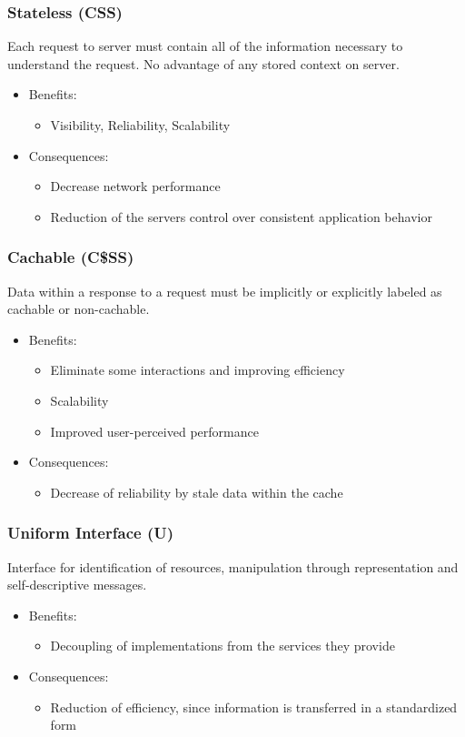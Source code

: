 \subsubsection*{Stateless (CSS)}
Each request to server must contain all of the information necessary to understand the request. No advantage of any stored context on server.
\begin{itemize}[noitemsep, topsep=0pt]
	\item Benefits:
		\begin{itemize}[noitemsep, topsep=0pt]
			\item Visibility, Reliability, Scalability
		\end{itemize}
	\item Consequences:	
		\begin{itemize}[noitemsep, topsep=0pt]
			\item Decrease network performance
			\item Reduction of the servers control over consistent application behavior
		\end{itemize} 
\end{itemize}
\subsubsection*{Cachable (C\$SS)}
Data within a response to a request must be implicitly or explicitly labeled as cachable or non-cachable.
\begin{itemize}[noitemsep, topsep=0pt]
	\item Benefits:
		\begin{itemize}[noitemsep, topsep=0pt]
			\item Eliminate some interactions and improving efficiency
			\item Scalability
			\item Improved user-perceived performance
		\end{itemize}
	\item Consequences:
		\begin{itemize}[noitemsep, topsep=0pt]
			\item Decrease of reliability by stale data within the cache
		\end{itemize}
\end{itemize}
\subsubsection*{Uniform Interface (U)}
Interface for identification of resources, manipulation through representation and self-descriptive messages.
\begin{itemize}[noitemsep, topsep=0pt]
	\item Benefits:
		\begin{itemize}[noitemsep, topsep=0pt]
			\item Decoupling of implementations from the services they provide
		\end{itemize}
	\item Consequences:
		\begin{itemize}[noitemsep, topsep=0pt]
			\item Reduction of efficiency, since information is transferred in a standardized form
		\end{itemize}
\end{itemize}
